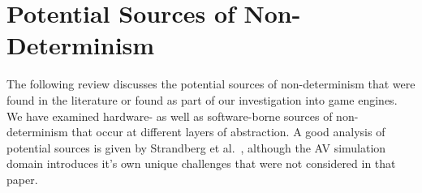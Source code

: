 \documentclass[letterpaper, 10 pt, journal, twoside]{IEEEtran}
\begin{document}
\section{Potential Sources of Non-Determinism} \label{s:nondeterminisimSources}

The following review discusses the potential sources of non-determinism that were found in the literature or found as part of our investigation into game engines. We have examined hardware- as well as software-borne sources of non-determinism that occur at different layers of abstraction. 
%
%
%
A good analysis of potential sources is given by Strandberg et al.~\cite{intermittently-failing-tests}, although the AV simulation domain introduces it's own unique challenges that were not considered in that paper.



\medskip

\end{document}
